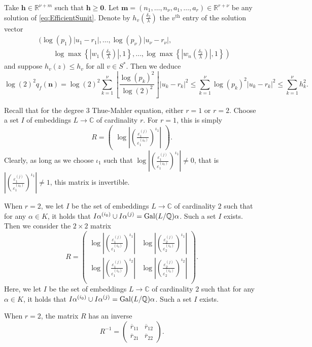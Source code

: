 Take $\mathbf{h}\in\mathbb{R}^{\nu+m}$ such that $\mathbf{h}\geq \mathbf{0}$. Let $\mathbf{m} = (n_1, \dots, n_{\nu}, a_1, \dots, a_r) \in \mathbb{R}^{r + \nu}$ be any solution of \eqref{eq:EfficientSunit}. Denote by $h_{v}\left(\frac{\delta_2}{\lambda}\right)$ the $v^{\text{th}}$ entry of the solution vector
\begin{align*}
&\bigg(\log(p_1)|u_1 - r_1|, \dots, \log(p_{\nu})|u_{\nu} - r_{\nu}|, \\
	& \quad \quad \left. \log \max \left\{ \left|w_1\left(\frac{\delta_2}{\lambda}\right)\right|, 1\right\}, \dots, \log \max \left\{ \left|w_n\left(\frac{\delta_2}{\lambda}\right)\right|, 1\right\}  \right)
\end{align*}
and suppose $h_v(z)\leq h_v$ for all $v\in S^*$. Then we deduce
\[\log(2)^2q_f(\mathbf{n}) = \log(2)^2\sum_{k = 1}^{\nu}\left\lfloor\frac{\log(p_k)^2}{\log(2)^2}\right\rfloor|u_k-r_k|^2 \leq \sum_{k = 1}^{\nu} \log(p_k)^2|u_k -r_k|^2 \leq \sum_{k = 1}^{\nu} h_k^2.\]

Recall that for the degree $3$ Thue-Mahler equation, either $r = 1$ or $r = 2$. Choose a set $I$ of embeddings $L \rightarrow \mathbb{C}$ of cardinality $r$. For $r = 1$, this is simply
\[R = \begin{pmatrix}
	\log\left|\left(\frac{\varepsilon_1^{(j)}}{\varepsilon_1^{(i_0)}}\right)^{\iota_1}\right| \end{pmatrix}.\]
Clearly, as long as we choose $\iota_1$ such that $\log\left|\left(\frac{\varepsilon_1^{(j)}}{\varepsilon_1^{(i_0)}}\right)^{\iota_1}\right| \neq 0$, that is $\left|\left(\frac{\varepsilon_1^{(j)}}{\varepsilon_1^{(i_0)}}\right)^{\iota_1}\right| \neq 1$, this matrix is invertible.

When $r = 2$, we let $I$ be the set of embeddings $L \to \mathbb{C}$ of cardinality $2$ such that for any $\alpha \in K$, it holds that $I\alpha^{(i_0)} \cup I\alpha^{(j)} = \operatorname{Gal}(L/\mathbb{Q})\alpha$. Such a set $I$ exists. Then we consider the $2 \times 2$ matrix
\[R = \begin{pmatrix}
	\log\left|\left(\frac{\varepsilon_1^{(j)}}{\varepsilon_1^{(i_0)}}\right)^{\iota_1}\right| &
	\log\left|\left(\frac{\varepsilon_2^{(j)}}{\varepsilon_2^{(i_0)}}\right)^{\iota_1}\right|\\
	\log\left|\left(\frac{\varepsilon_1^{(j)}}{\varepsilon_1^{(i_0)}}\right)^{\iota_2}\right| &
	\log\left|\left(\frac{\varepsilon_2^{(j)}}{\varepsilon_2^{(i_0)}}\right)^{\iota_2}\right|\\
	\end{pmatrix}.\]
Here, we let $I$ be the set of embeddings $L \to \mathbb{C}$ of cardinality $2$ such that for any $\alpha \in K$, it holds that $I\alpha^{(i_0)} \cup I\alpha^{(j)} = \operatorname{Gal}(L/\mathbb{Q})\alpha$. Such a set $I$ exists. 
\begin{lemma}
When $r = 2$, the matrix $R$ has an inverse
\[R^{-1} = \begin{pmatrix}
	\overline{r}_{11} & \overline{r}_{12} \\
	\overline{r}_{21} & \overline{r}_{22}
\end{pmatrix}.\]
\end{lemma}
	
